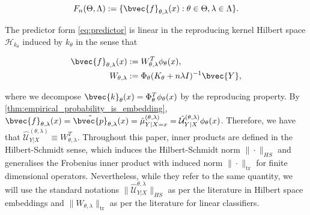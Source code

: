 \documentclass{article}
\begin{document}
		\begin{equation}
			F_{n}(\Theta, \Lambda) := \{ \bvec{f}_{\theta, \lambda}(x) : \theta \in \Theta, \lambda \in \Lambda \}.
		\label{eq:predictor_class}
		\end{equation}
		
		The predictor form \eqref{eq:predictor} is linear in the reproducing kernel Hilbert space $\mathcal{H}_{k_{\theta}}$ induced by $k_{\theta}$ in the sense that
		
		\begin{equation}
			\begin{aligned}
				\bvec{f}_{\theta, \lambda}(x) &:= W_{\theta, \lambda}^{T} \phi_{\theta}(x), \\
				W_{\theta, \lambda} &:= \Phi_{\theta} (K_{\theta} + n \lambda I)^{-1} \bvec{Y},
			\end{aligned}
		\label{eq:linear_predictor}
		\end{equation}
		
		where we decompose $\bvec{k}_{\theta}(x) = \Phi_{\theta}^{T} \phi_{\theta}(x)$ by the reproducing property. By \cref{thm:empirical_probability_is_embedding}, $\bvec{f}_{\theta, \lambda}(x) = \hat{\bvec{p}}_{\theta, \lambda}(x) = \hat{\mu}^{(\theta, \lambda)}_{Y | X = x} = \hat{\mathcal{U}}^{(\theta, \lambda)}_{Y | X} \phi_{\theta}(x)$. Therefore, we have that $\hat{\mathcal{U}}^{(\theta, \lambda)}_{Y | X} \equiv W_{\theta, \lambda}^{T}$. Throughout this paper, inner products are defined in the Hilbert-Schmidt sense, which induces the Hilbert-Schmidt norm $\| \cdot \|_{HS}$ and generalises the Frobenius inner product with induced norm $\| \cdot \|_{\mathrm{tr}}$ for finite dimensional operators. Nevertheless, while they refer to the same quantity, we will use the standard notations $ \| \hat{\mathcal{U}}^{\theta, \lambda}_{Y | X} \|_{HS}$ as per the literature in Hilbert space embeddings and $\| W_{\theta, \lambda} \|_{\mathrm{tr}}$ as per the literature for linear classifiers.
\end{document}
